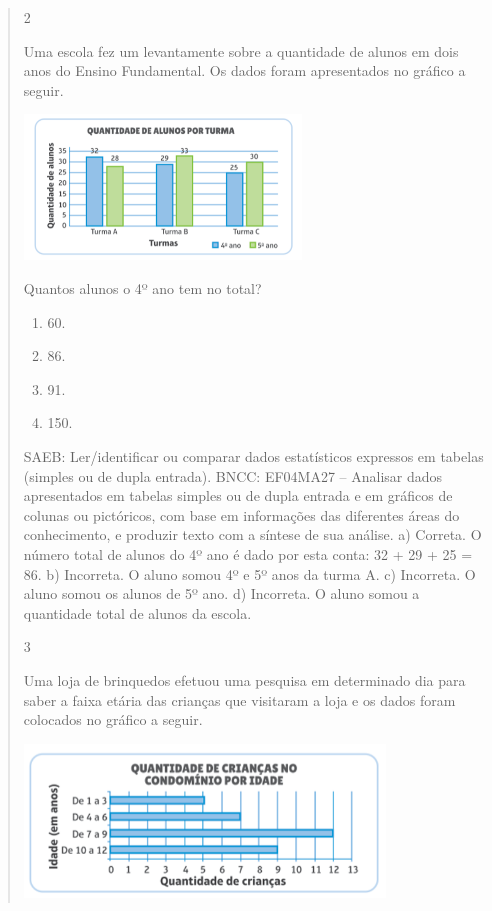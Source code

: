 \begin{mdframed}[linewidth=2pt,linecolor=salmao,roundcorner=2pt]
\begin{itemize}
{\begin{itemize}
\begin{escolha}
{\begin{quote}
{\begin{escolha}
{{{\num{2}

Uma escola fez um levantamente sobre a quantidade de alunos em dois anos
do Ensino Fundamental. Os dados foram apresentados no gráfico a seguir.


\includegraphics[width=2.89744in,height=1.52156in]{media/image104.png}

Quantos alunos o 4º ano tem no total?

\begin{enumerate}
\item
  60.
\item
  86.
\item
  91.
\item
  150.
\end{enumerate}

SAEB: Ler/identificar ou comparar dados estatísticos expressos em tabelas (simples ou de dupla entrada).
BNCC: EF04MA27 -- Analisar dados apresentados em tabelas simples ou de dupla entrada e em gráficos de
colunas ou pictóricos, com base em informações das diferentes áreas do conhecimento, e produzir
texto com a síntese de sua análise.
a)  Correta. O número total de alunos do 4º ano é dado por esta conta: 32 + 29 + 25 = 86.
b)  Incorreta. O aluno somou 4º e 5º anos da turma A.
c)  Incorreta. O aluno somou os alunos de 5º ano.
d)  Incorreta. O aluno somou a quantidade total de alunos da escola.

\num{3}

Uma loja de brinquedos efetuou uma pesquisa em determinado dia para
saber a faixa etária das crianças que visitaram a loja e os dados foram
colocados no gráfico a seguir.

\includegraphics[width=3.77564in,height=1.60972in]{media/image105.png}

}}}
\end{escolha}}
\end{quote}}
\end{escolha}
\end{itemize}}
\end{itemize}
\end{mdframed}
